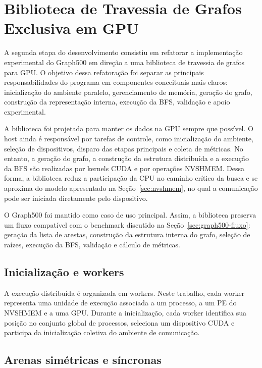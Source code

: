 \section{Biblioteca de Travessia de Grafos Exclusiva em GPU}
\label{sec:biblioteca-gpu}

A segunda etapa do desenvolvimento consistiu em refatorar a implementação
experimental do Graph500 em direção a uma biblioteca de travessia de grafos para
GPU. O objetivo dessa refatoração foi separar as principais responsabilidades do
programa em componentes conceituais mais claros: inicialização do ambiente
paralelo, gerenciamento de memória, geração do grafo, construção da representação
interna, execução da BFS, validação e apoio experimental.

A biblioteca foi projetada para manter os dados na GPU sempre que possível. O
host ainda é responsável por tarefas de controle, como inicialização do ambiente,
seleção de dispositivos, disparo das etapas principais e coleta de métricas. No
entanto, a geração do grafo, a construção da estrutura distribuída e a execução
da BFS são realizadas por kernels CUDA e por operações NVSHMEM. Dessa forma, a
biblioteca reduz a participação da CPU no caminho crítico da busca e se aproxima
do modelo apresentado na Seção~\ref{sec:nvshmem}, no qual a comunicação pode ser
iniciada diretamente pelo dispositivo.

O Graph500 foi mantido como caso de uso principal. Assim, a biblioteca preserva
um fluxo compatível com o benchmark discutido na Seção~\ref{sec:graph500-fluxo}:
geração da lista de arestas, construção da estrutura interna do grafo, seleção de
raízes, execução da BFS, validação e cálculo de métricas.

\subsection{Inicialização e workers}

A execução distribuída é organizada em workers. Neste trabalho, cada worker
representa uma unidade de execução associada a um processo, a um PE do NVSHMEM e
a uma GPU. Durante a inicialização, cada worker identifica sua posição no
conjunto global de processos, seleciona um dispositivo CUDA e participa da
inicialização coletiva do ambiente de comunicação.

\subsection{Arenas simétricas e síncronas}

